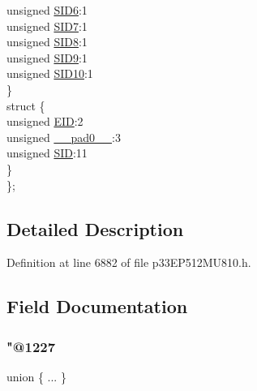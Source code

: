 \begin{DoxyCompactItemize}
\begin{tabbing}
\>\>unsigned \hyperlink{structtag_c2_r_x_f12_s_i_d_b_i_t_s_a70d70952133eb2389d5c326f9f0e8035}{SID6}:1\\
\>\>unsigned \hyperlink{structtag_c2_r_x_f12_s_i_d_b_i_t_s_a34097fb76decd431701fa2d86a22328e}{SID7}:1\\
\>\>unsigned \hyperlink{structtag_c2_r_x_f12_s_i_d_b_i_t_s_afe74894633244fdb0b0c01b4e8c522e7}{SID8}:1\\
\>\>unsigned \hyperlink{structtag_c2_r_x_f12_s_i_d_b_i_t_s_a33587704948067005c2a6a3ccc503c99}{SID9}:1\\
\>\>unsigned \hyperlink{structtag_c2_r_x_f12_s_i_d_b_i_t_s_a1a9084031c7f5fb16007feeebf0d8216}{SID10}:1\\
\>\} \\
\>struct \{\\
\>\>unsigned \hyperlink{structtag_c2_r_x_f12_s_i_d_b_i_t_s_ae80b378c9141f7c03e0b4e55b5f4b54d}{EID}:2\\
\>\>unsigned \hyperlink{structtag_c2_r_x_f12_s_i_d_b_i_t_s_adf71f3d8410c1f1dbbc96680a92c49af}{\_\_pad0\_\_}:3\\
\>\>unsigned \hyperlink{structtag_c2_r_x_f12_s_i_d_b_i_t_s_af88edf93b2fee2432665bd84f51287e4}{SID}:11\\
\>\} \\
\}; \\

\end{tabbing}\end{DoxyCompactItemize}


\subsection{Detailed Description}


Definition at line 6882 of file p33\+E\+P512\+M\+U810.\+h.



\subsection{Field Documentation}
\mbox{\label{structtag_c2_r_x_f12_s_i_d_b_i_t_s_ace556980be2eff7d3de967cd26067a24}} 
\subsubsection{\texorpdfstring{"@1227}{@1227}}
{\footnotesize\ttfamily union \{ ... \} }

\mbox{\label{structtag_c2_r_x_f12_s_i_d_b_i_t_s_adf71f3d8410c1f1dbbc96680a92c49af}} 
